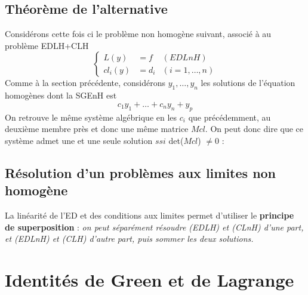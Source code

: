 \documentclass[british,french,11pt, a4paper, openany]{book}
\begin{document}
									
		\subsection{Théorème de l'alternative}
		Considérons cette fois ci le problème non homogène suivant, associé à au problème EDLH+CLH
		\begin{equation}
			\left\{\begin{array}{lll}
			L(y) &= f & (EDLnH)\\
			cl_i(y) &= d_i & (i=1,\dots,n)
			\end{array}\right.
		\end{equation}
		Comme à la section précédente, considérons $y_1,\dots,y_n$ les solutions de l'équation homogènes dont la SGEnH est
		\begin{equation}
			c_1y_1 + \dots + c_ny_n + y_p
		\end{equation}
		On retrouve le même système algébrique en les $c_i$ que précédemment, au deuxième membre près et donc une même matrice $Mcl$. On peut donc dire que ce système admet une et une seule solution $ssi$ det($Mcl$) $\neq 0$ :\\
									
										
		\subsection{Résolution d'un problèmes aux limites non homogène}
		La linéarité de l'ED et des conditions aux limites permet d'utiliser le \textbf{principe de superposition} : \textit{on peut séparément résoudre (EDLH) et (CLnH) d'une part, et (EDLnH) et (CLH) d'autre part, puis sommer les deux solutions.}
										
		\setcounter{section}{2}
		\section{Identités de Green et de Lagrange}
		\setcounter{subsection}{-1}
\end{document}
